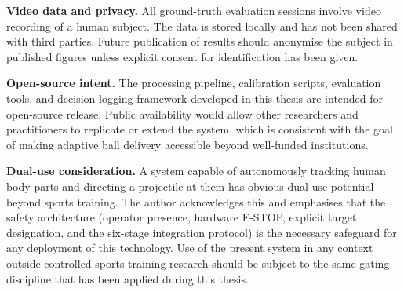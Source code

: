 \textbf{Video data and privacy.} All ground-truth evaluation sessions involve video recording of a human subject. The data is stored locally and has not been shared with third parties. Future publication of results should anonymise the subject in published figures unless explicit consent for identification has been given.

\textbf{Open-source intent.} The processing pipeline, calibration scripts, evaluation tools, and decision-logging framework developed in this thesis are intended for open-source release. Public availability would allow other researchers and practitioners to replicate or extend the system, which is consistent with the goal of making adaptive ball delivery accessible beyond well-funded institutions.

\textbf{Dual-use consideration.} A system capable of autonomously tracking human body parts and directing a projectile at them has obvious dual-use potential beyond sports training. The author acknowledges this and emphasises that the safety architecture (operator presence, hardware E-STOP, explicit target designation, and the six-stage integration protocol) is the necessary safeguard for any deployment of this technology. Use of the present system in any context outside controlled sports-training research should be subject to the same gating discipline that has been applied during this thesis.
